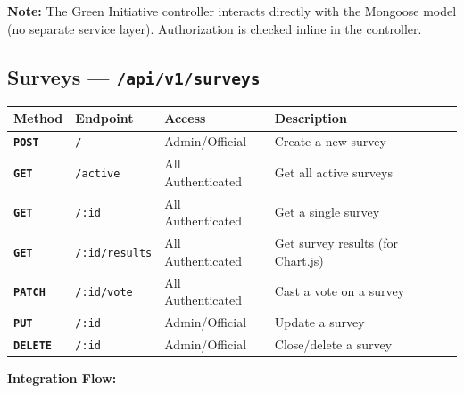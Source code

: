 \documentclass[12pt,a4paper]{article}
\newcommand{\GET}{\colorbox{routeget}{\texttt{\textbf{\color{white}GET}}}}
\newcommand{\POST}{\colorbox{routepost}{\texttt{\textbf{\color{white}POST}}}}
\newcommand{\PATCH}{\colorbox{routepatch}{\texttt{\textbf{\color{white}PATCH}}}}
\newcommand{\DELETE}{\colorbox{routedelete}{\texttt{\textbf{\color{white}DELETE}}}}
\newcommand{\PUT}{\colorbox{routeput}{\texttt{\textbf{\color{white}PUT}}}}
\begin{document}
\noindent\textbf{Note:} The Green Initiative controller interacts directly with the Mongoose model (no separate service layer). Authorization is checked inline in the controller.

\subsection{Surveys --- \texttt{/api/v1/surveys}}

\begin{longtable}{@{}p{1.2cm}p{4cm}p{2.8cm}p{4.5cm}@{}}
\toprule
\textbf{Method} & \textbf{Endpoint} & \textbf{Access} & \textbf{Description} \\
\midrule
\endhead
\POST   & \texttt{/}             & Admin/Official        & Create a new survey \\[4pt]
\GET    & \texttt{/active}       & All Authenticated     & Get all active surveys \\[4pt]
\GET    & \texttt{/:id}          & All Authenticated     & Get a single survey \\[4pt]
\GET    & \texttt{/:id/results}  & All Authenticated     & Get survey results (for Chart.js) \\[4pt]
\PATCH  & \texttt{/:id/vote}     & All Authenticated     & Cast a vote on a survey \\[4pt]
\PUT    & \texttt{/:id}          & Admin/Official        & Update a survey \\[4pt]
\DELETE & \texttt{/:id}          & Admin/Official        & Close/delete a survey \\
\bottomrule
\end{longtable}

\noindent\textbf{Integration Flow:}
\begin{center}
\end{center}
\end{document}
